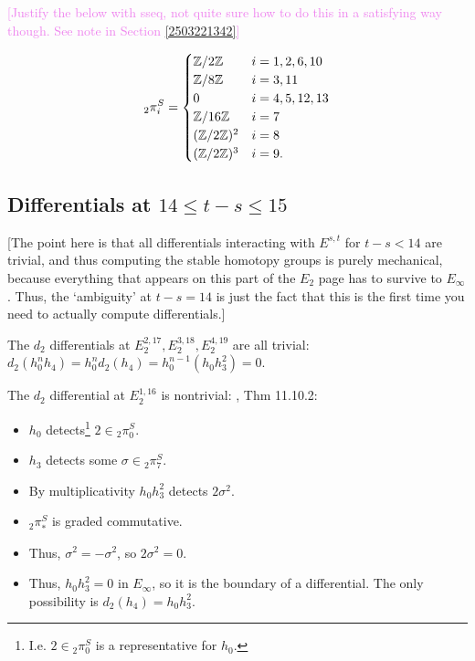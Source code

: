 \documentclass{MetricNotes2023}
\def\bb{\ensuremath\mathbb}
\def\inte{\ensuremath\mathbb{Z}}
\DeclareMathOperator{\Ext}{Ext}
\def\textcolour{\textcolor}
\begin{document}

\textcolour{violet}{[Justify the below with sseq, not quite sure how to do this in a satisfying way though. See note in Section \ref{2503221342}]}

\begin{theorem}
\begin{align*}
\text{}_{2}\pi_i^S = \begin{cases}
\inte/2\inte & i = 1, 2, 6,10\\
\inte/8\inte & i = 3, 11\\
0 & i = 4, 5, 12, 13\\
\inte/16\inte & i = 7\\
(\inte/2\inte)^2 & i = 8\\
(\inte/2\inte)^3 & i=9.
\end{cases}
\end{align*}
\end{theorem}

\subsection{Differentials at \(14\leq t-s\leq 15\)}

[The point here is that all differentials interacting with \(E^{s,t}\) for \(t-s<14\) are trivial, and thus computing the stable homotopy groups is purely mechanical, because everything that appears on this part of the \(E_2\) page has to survive to \(E_\infty\). Thus, the `ambiguity' at \(t-s=14\) is just the fact that this is the first time you need to actually compute differentials.]

The \(d_2\) differentials at \(E_2^{2, 17},  E_2^{3, 18}, E_2^{4, 19}\) are all trivial: \(d_2(h_0^nh_4)=h_0^nd_2(h_4)=h_0^{n-1}(h_0h_3^2)=0\). 

The \(d_2\) differential at \(E^{1, 16}_2\) is nontrivial: \autocite{rognes2}, Thm 11.10.2:
\begin{itemize}
\item \(h_0\) detects\footnote{I.e. \(2\in \text{}_2\pi_0^S\) is a representative for \(h_0\).} \(2 \in \text{}_2\pi^S_0\).
\item \(h_3\) detects some \(\sigma \in \text{}_2\pi^S_7\).
\item By multiplicativity \(h_0h_3^2\) detects \(2 \sigma^2\).
\item \(\text{}_2\pi_*^S\) is graded commutative.
\item Thus, \(\sigma^2=-\sigma^2\), so \(2 \sigma^2=0\).
\item Thus, \(h_0h_3^2=0\) in \(E_\infty\), so it is the boundary of a differential. The only possibility is \(d_2(h_4)=h_0h_3^2\). 
\end{itemize}
\end{document}
